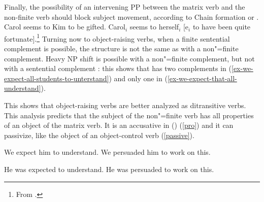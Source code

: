 Finally, the possibility of an intervening PP between the matrix verb and the non-finite verb should
block subject movement, according to Chain formation or 
\citep{Rizzi1986,Rizzi1990b-u}.
\eal
\ex Carol seems to Kim to be gifted.
\ex Carol$_i$ seems to herself$_i$ [e$_i$ to have been quite fortunate].\footnote{
From \citet[]{McGinnis2004a-u}.
}
\zl
Turning now to object-raising verbs, when a finite sentential complement is possible, the structure
is not the same as  with a non"=finite complement. Heavy NP shift is possible with a non"=finite
complement, but not with a sentential complement \parencites[]{Bresnan1982}[]{PollardandSag1994}: this shows that  has two complements in (\ref{ex-we-expect-all-students-to-unterstand}) and only one in (\ref{ex-we-expect-that-all-understand}).

\eal
{}
\zl



\noindent
This shows that object-raising verbs are better analyzed as ditransitive verbs. This analysis predicts that the subject of the non"=finite verb has all properties of an object of the matrix verb. It is an accusative in  () (\ref{pro}) and it can passivize, like the object of an object-control verb (\ref{passive}).

\begin{exe}
\ex
\begin{xlist} \label{pro}
\ex We expect him to understand.
\ex  We persuaded him to work on this.
\end{xlist}
\ex \begin{xlist} \label{passive}
\ex  He was expected to understand.
\ex  He was persuaded to work on this.
\end{xlist}
	
\end{exe}



